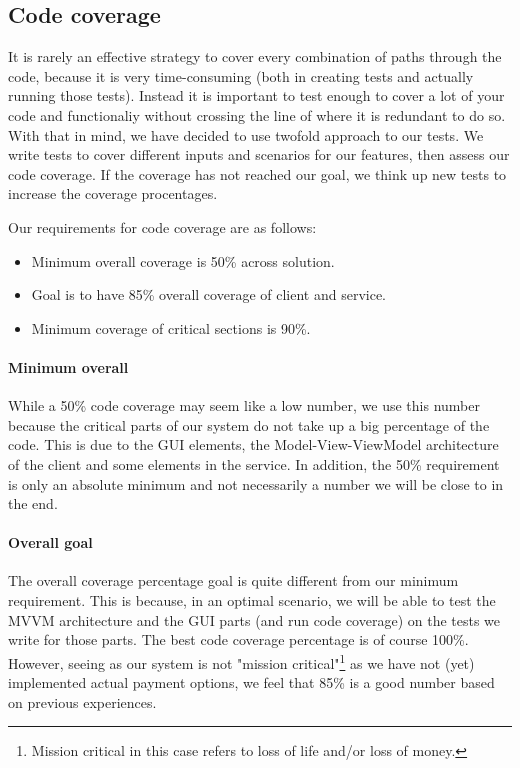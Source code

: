 \subsection{Code coverage}
\label{testing_strategy_coverage}
It is rarely an effective strategy to cover every combination of paths through the code, because it is very time-consuming (both in creating tests and actually running those tests). Instead it is important to test enough to cover a lot of your code and functionaliy without crossing the line of where it is redundant to do so\cite{The Way of Testivus}. With that in mind, we have decided to use twofold approach to our tests. We write tests to cover different inputs and scenarios for our features, then assess our code coverage. If the coverage has not reached our goal, we think up new tests to increase the coverage procentages.

Our requirements for code coverage are as follows:
\begin{itemize}
\item Minimum overall coverage is 50\% across solution.
\item Goal is to have 85\% overall coverage of client and service.
\item Minimum coverage of critical sections is 90\%.
\end{itemize}

\paragraph{Minimum overall}
While a 50\% code coverage may seem like a low number, we use this number because the critical parts of our system do not take up a big percentage of the code. This is due to the GUI elements, the Model-View-ViewModel architecture of the client and some elements in the service. In addition, the 50\% requirement is only an absolute minimum and not necessarily a number we will be close to in the end.

\paragraph{Overall goal}
The overall coverage percentage goal is quite different from our minimum requirement. This is because, in an optimal scenario, we will be able to test the MVVM architecture and the GUI parts (and run code coverage) on the tests we write for those parts. The best code coverage percentage is of course 100\%. However, seeing as our system is not "mission critical"\footnote{Mission critical in this case refers to loss of life and/or loss of money.} as we have not (yet) implemented actual payment options, we feel that 85\% is a good number based on previous experiences.

